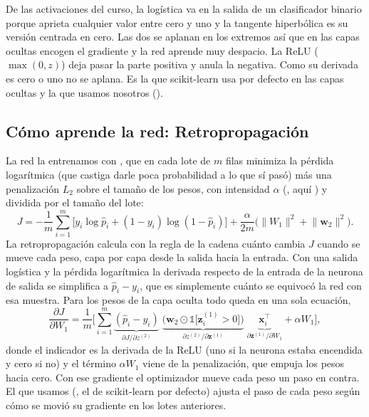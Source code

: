 De las activaciones del curso, la logística va en la salida de un
clasificador binario porque aprieta cualquier valor entre cero y uno y la
tangente hiperbólica es su versión centrada en cero. Las dos se aplanan en los
extremos así que en las capas ocultas encogen el gradiente y la red aprende
muy despacio. La ReLU
($\max(0,z)$) deja pasar la parte positiva y anula la negativa. Como su
derivada es cero o uno no se aplana. Es la que scikit-learn usa por defecto
en las capas ocultas y la que usamos nosotros (\codigo{\ClfMLPActivacion}).

\subsection{Cómo aprende la red: Retropropagación}

La red la entrenamos con , que en cada lote de $m$ filas
minimiza la pérdida logarítmica (que castiga darle poca probabilidad a lo que
sí pasó) más una penalización $L_2$ sobre el tamaño de los pesos, con
intensidad $\alpha$ (, aquí \ClfMLPAlfa{}) y dividida por el
tamaño del lote:
\begin{equation}
J=-\frac{1}{m}\sum_{i=1}^{m}\Big[y_i\log\hat{p}_i+(1-y_i)\log(1-\hat{p}_i)\Big]
+\frac{\alpha}{2m}\Big(\lVert W_1\rVert^2+\lVert \mathbf{w}_2\rVert^2\Big).
\label{eq:perdida-mlp}
\end{equation}
La retropropagación calcula con la regla de la cadena cuánto cambia $J$ cuando
se mueve cada peso, capa por capa desde la salida hacia la entrada. Con una
salida logística y la pérdida logarítmica la derivada respecto de la entrada
de la neurona de salida se simplifica a $\hat{p}_i-y_i$, que es simplemente
cuánto se equivocó la red con esa muestra. Para los pesos de la capa oculta
todo queda en una sola ecuación,
\begin{equation}
\frac{\partial J}{\partial W_1}
=\frac{1}{m}\Bigg[\sum_{i=1}^{m}
\underbrace{(\hat{p}_i-y_i)}_{\partial J/\partial z^{(2)}}\;
\underbrace{\Big(\mathbf{w}_2\odot\mathbb{1}\big[\mathbf{z}^{(1)}_i>0\big]\Big)}_{\partial z^{(2)}/\partial\mathbf{z}^{(1)}}\;
\underbrace{\mathbf{x}_i^\top}_{\partial\mathbf{z}^{(1)}/\partial W_1}
+\alpha W_1\Bigg],
\label{eq:retropropagacion}
\end{equation}
donde el indicador es la derivada de la ReLU (uno si la neurona estaba
encendida y cero si no) y el término $\alpha W_1$ viene de la penalización,
que empuja los pesos hacia cero. Con ese gradiente el optimizador mueve cada
peso un paso en contra. El que usamos (\codigo{\ClfMLPOptimizador}, el de
scikit-learn por defecto) ajusta el paso de cada peso según cómo se movió su
gradiente en los lotes anteriores.

